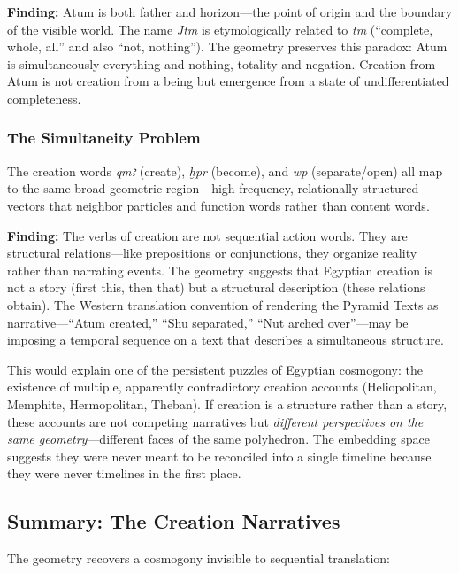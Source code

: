 \documentclass[11pt, a4paper]{article}
\begin{document}
{\color{insight}\textbf{Finding:}} Atum is both father and horizon---the point of origin and the boundary of the visible world. The name \textit{Jtm} is etymologically related to \textit{tm} (``complete, whole, all'' and also ``not, nothing''). The geometry preserves this paradox: Atum is simultaneously everything and nothing, totality and negation. Creation from Atum is not creation from a being but emergence from a state of undifferentiated completeness.

\subsubsection{The Simultaneity Problem}

The creation words \textit{qmꜣ} (create), \textit{ḫpr} (become), and \textit{wp} (separate/open) all map to the same broad geometric region---high-frequency, relationally-structured vectors that neighbor particles and function words rather than content words.

{\color{insight}\textbf{Finding:}} The verbs of creation are not sequential action words. They are structural relations---like prepositions or conjunctions, they organize reality rather than narrating events. The geometry suggests that Egyptian creation is not a story (first this, then that) but a structural description (these relations obtain). The Western translation convention of rendering the Pyramid Texts as narrative---``Atum created,'' ``Shu separated,'' ``Nut arched over''---may be imposing a temporal sequence on a text that describes a simultaneous structure.

This would explain one of the persistent puzzles of Egyptian cosmogony: the existence of multiple, apparently contradictory creation accounts (Heliopolitan, Memphite, Hermopolitan, Theban). If creation is a structure rather than a story, these accounts are not competing narratives but \textit{different perspectives on the same geometry}---different faces of the same polyhedron. The embedding space suggests they were never meant to be reconciled into a single timeline because they were never timelines in the first place.

\subsection{Summary: The Creation Narratives}

The geometry recovers a cosmogony invisible to sequential translation:
\end{document}
